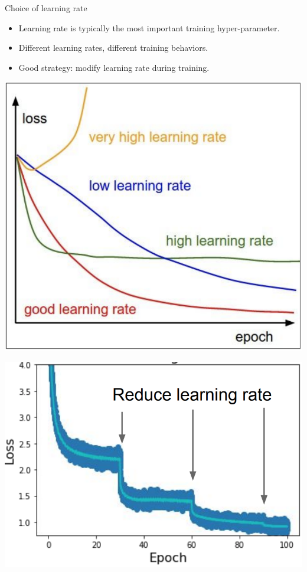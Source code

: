 \begin{frame}{Choice of learning rate}
\begin{itemize}
\item Learning rate is typically the most important training hyper-parameter.
\item Different learning rates, different training behaviors.
\item Good strategy: modify learning rate during training.
\end{itemize}
\vsp
\begin{minipage}{0.45\linewidth}
  \begin{center}
    \includegraphics[height=0.6\textheight]{figures/different-lr.png}
  \end{center}
\end{minipage}
\hspace{3mm}
\begin{minipage}{0.45\linewidth}
  \begin{center}
    \includegraphics[height=0.6\textheight]{figures/lr-reduce-v2.png}

\end{center}
\end{minipage}
\end{frame}
